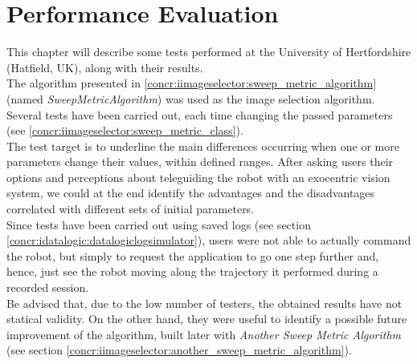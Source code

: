 \setcounter{figure}{0}
\setcounter{table}{0}
\setcounter{lstlisting}{0}

\section{Performance Evaluation}
\label{sec:performance_evaluation}

This chapter will describe some tests performed at the 
University of Hertfordshire (Hatfield, UK), along with 
their results. 
\\
The algorithm presented in \ref{concr:iimageselector:sweep_metric_algorithm}
(named \textit{SweepMetricAlgorithm}) was used as the image
selection algorithm. Several tests 
have been carried out, each time changing the passed parameters
(see \ref{concr:iimageselector:sweep_metric_class}).
\\
The test target is to underline the main differences 
occurring when one or more parameters change their values, 
within defined ranges. After asking users their options 
and perceptions about teleguiding the robot with an 
exocentric vision system, we could at the end identify 
the advantages and the disadvantages correlated with 
different sets of initial parameters.
\\
Since tests have been carried out using saved logs 
(see section \ref{concr:idatalogic:datalogiclogsimulator}),
users were not 
able to actually command the robot, but simply 
to request the application to go one step
further and, hence, just see the robot moving along 
the trajectory it performed during a recorded 
session.
\\
Be advised that, due to the low number of testers, 
the obtained results have not statical validity.
On the other hand, they were useful to identify 
a possible future improvement of the algorithm,
built later with \textit{Another Sweep Metric Algorithm} 
(see section \ref{concr:iimageselector:another_sweep_metric_algorithm}).

\newpage

\newpage

\newpage

\newpage

